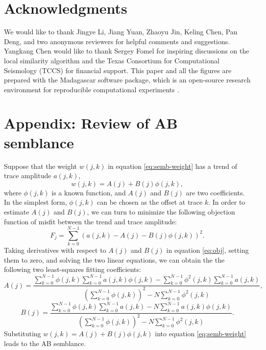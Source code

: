 \section{Acknowledgments}
We would like to thank Jingye Li, Jiang Yuan, Zhaoyu Jin, Keling Chen,  Pan Deng,  and two anonymous reviewers for helpful comments and suggestions. Yangkang Chen would like to thank Sergey Fomel for inspiring discussions on the local similarity algorithm and the Texas Consortium for Computational Seismology (TCCS) for financial support. This paper and all the figures are prepared with the Madagascar software package, which is an open-source research environment for reproducible computational experiments \cite[]{mada2013}. %




\appendix
\section{Appendix: Review of AB semblance}
Suppose that the weight $w(j,k)$ in equation \ref{eq:semb-weight} has a trend of trace amplitude $a(j,k)$, 
\begin{equation}
\label{eq:trend}
w(j,k)=A(j)+B(j)\phi(j,k),
\end{equation}
where $\phi(j,k)$ is a known function, and $A(j)$ and $B(j)$ are two coefficients. In the simplest form, $\phi(j,k)$ can be chosen as the offset at trace $k$. In order to estimate $A(j)$ and $B(j)$, we can turn to minimize the following objection function of misfit between the trend and trace amplitude:
\begin{equation}
\label{eq:obj}
F_j=\sum_{k=0}^{N-1}\left(a(j,k)-A(j)-B(j)\phi(j,k)\right)^2.
\end{equation}
Taking derivatives with respect to $A(j)$ and $B(j)$ in equation \ref{eq:obj}, setting them to zero, and solving the two linear equations, we can obtain the the following two least-squares fitting coefficients:
\begin{equation}
\label{eq:A}
A(j)=\frac{\displaystyle\sum_{k=0}^{N-1}\phi(j,k)\sum_{k=0}^{N-1}a(j,k)\phi(j,k) - \sum_{k=0}^{N-1}\phi^2(j,k)\sum_{k=0}^{N-1}a(j,k)}{\displaystyle\left(\sum_{k=0}^{N-1}\phi(j,k)\right)^2-N\sum_{k=0}^{N-1}\phi^2(j,k)},
\end{equation}
\begin{equation}
\label{eq:B}
B(j)=\frac{\displaystyle\sum_{k=0}^{N-1}\phi(j,k)\sum_{k=0}^{N-1}a(j,k) - N\sum_{k=0}^{N-1}a(j,k)\phi(j,k)}{\displaystyle\left(\sum_{k=0}^{N-1}\phi(j,k)\right)^2-N\sum_{k=0}^{N-1}\phi^2(j,k)}.
\end{equation}
Substituting $w(j,k)=A(j)+B(j)\phi(j,k)$ into equation \ref{eq:semb-weight} leads to the AB semblance.







